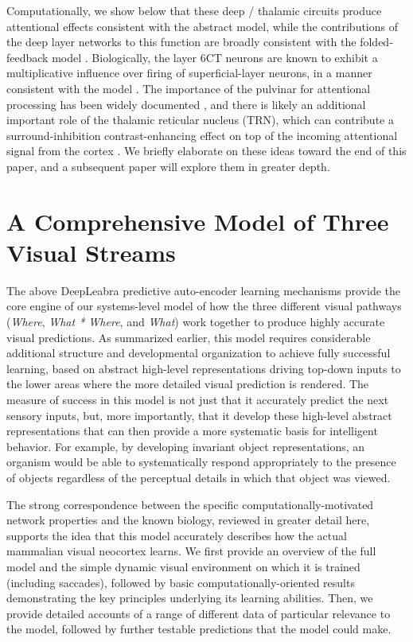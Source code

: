\documentclass[11pt,twoside]{article}
\newif\myifpdf
\begin{document}
\begin{itemize}
Computationally, we show below that these deep / thalamic circuits produce attentional effects consistent with the abstract  model, while the contributions of the deep layer networks to this function are broadly consistent with the folded-feedback model \cite{Grossberg99}.  Biologically, the layer 6CT neurons are known to exhibit a multiplicative influence over firing of superficial-layer neurons, in a manner consistent with the  model \cite{BortoneOlsenScanziani14,OlsenBortoneAdesnikEtAl12}.  The importance of the pulvinar for attentional processing has been widely documented \cite[e.g.,]{LaBergeBuchsbaum90,BenderYouakim01,SaalmannPinskWangEtAl12}, and there is likely an additional important role of the thalamic reticular nucleus (TRN), which can contribute a surround-inhibition contrast-enhancing effect on top of the incoming attentional signal from the cortex \cite{Crick84,Pinault04,WimmerSchmittDavidsonEtAl15}.  We briefly elaborate on these ideas toward the end of this paper, and a subsequent paper will explore them in greater depth.

\end{itemize}

\section{A Comprehensive Model of Three Visual Streams}

The above DeepLeabra predictive auto-encoder learning mechanisms provide the core engine of our systems-level model of how the three different visual pathways ({\em Where}, {\em What * Where}, and {\em What}) work together to produce highly accurate visual predictions.  As summarized earlier, this model requires considerable additional structure and developmental organization to achieve fully successful learning, based on abstract high-level representations driving top-down inputs to the lower areas where the more detailed visual prediction is rendered.  The measure of success in this model is not just that it accurately predict the next sensory inputs, but, more importantly, that it develop these high-level abstract representations that can then provide a more systematic basis for intelligent behavior.  For example, by developing invariant object representations, an organism would be able to systematically respond appropriately to the presence of objects regardless of the perceptual details in which that object was viewed.

The strong correspondence between the specific computationally-motivated network properties and the known biology, reviewed in greater detail here, supports the idea that this model accurately describes how the actual mammalian visual neocortex learns.  We first provide an overview of the full model and the simple dynamic visual environment on which it is trained (including saccades), followed by basic computationally-oriented results demonstrating the key principles underlying its learning abilities.  Then, we provide detailed accounts of a range of different data of particular relevance to the model, followed by further testable predictions that the model could make.
\end{document}
